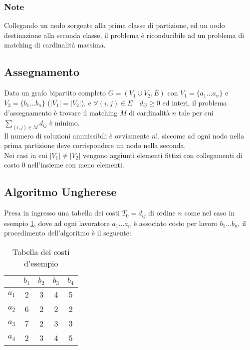 \documentclass[../template]{subfiles}
\begin{document}
\subsubsection{Note}
Collegando un nodo sorgente alla prima classe di partizione, ed un nodo destinazione alla seconda classe, il problema è riconducibile ad un
problema di matching di cardinalità massima.

\subsection{Assegnamento}
Dato un grafo bipartito completo $G = (V_1 \cup V_2, E)$ con $V_1 = \{a_1 \dots a_n\}$ e $V_2 = \{b_1 \dots b_n\}$ ($|V_1| = |V_2|$),
e $\forall (i, j) \in E \quad d_{ij} \ge 0$ ed interi,
il problema d'assegnamento è trovare il matching $M$ di cardinalità $n$ tale per cui
$\sum_{(i, j) \in M} d_{ij}$ è minimo.
\\[10pt]
Il numero di soluzioni ammissibili è ovviamente $n!$, siccome ad ogni nodo nella prima
partizione deve corrispondere un nodo nella seconda.
\\
Nei casi in cui $|V_1| \neq |V_2|$ vengono aggiunti elementi fittizi con collegamenti di costo 0 nell'insieme con meno elementi.

\subsection{Algoritmo Ungherese}

Presa in ingresso una tabella dei costi $T_0 = d_{ij}$ di ordine $n$ come nel caso in esempio
\ref{tab:hungarian_example}, dove ad ogni lavoratore $a_1 \dots a_n$ è associato costo per lavoro $b_1 \dots b_n$, il
procedimento dell'algoritmo è il seguente:

\begin{table}[h]
    \centering
    \begin{tabular}{|c|cccc|}
        \hline
    & $b_1$ & $b_2$ & $b_3$ & $b_4$\\
    \hline
        $a_1$ & 2 & 3 & 4 & 5\\
        $a_2$ & 6 & 2 & 2 & 2\\
        $a_3$ & 7 & 2 & 3 & 3\\
        $a_4$ & 2 & 3 & 4 & 5\\
        \hline
    \end{tabular}
    \caption{Tabella dei costi d'esempio}
    \label{tab:hungarian_example}
\end{table}
\end{document}

